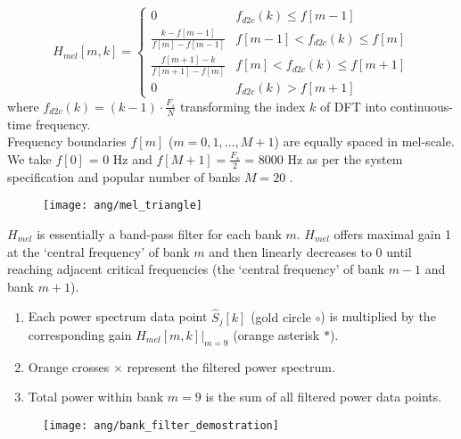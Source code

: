 
\begin{frame}
\begin{equation}
H_{mel}[m, k] =
\begin{cases}
0 &f_{d2c}(k) \le f[m-1]\\
\displaystyle\frac{k - f[m-1]}{f[m] - f[m-1]} &f[m-1] < f_{d2c}(k) \le f[m]\\
\displaystyle\frac{f[m+1] - k}{f[m+1] - f[m]} &f[m] < f_{d2c}(k) \le f[m+1]\\
0 &f_{d2c}(k) > f[m+1]
\end{cases}
\end{equation}
where $f_{d2c}(k) = (k-1) \cdot \frac{F_s}{N}$ transforming the index $k$ of DFT into continuous-time frequency.\\
\vspace{10pt}
Frequency boundaries $f[m]$ ($m = 0, 1, \dots, M+1$) are equally spaced in mel-scale. We take $f[0]$ = 0 Hz and $f[M+1] = \frac{F_s}{2}$ = 8000 Hz as per the system specification and popular number of banks $M = 20$ \cite{davis1980comparison}.
\end{frame}


\begin{frame}
\begin{figure}[H]
\centering
\texttt{[image: ang/mel\_triangle]}
\end{figure}

$H_{mel}$ is essentially a band-pass filter for each bank $m$. $H_{mel}$ offers maximal gain 1 at the `central frequency' of bank $m$ and then linearly decreases to 0 until reaching adjacent critical frequencies (the `central frequency' of bank $m-1$ and bank $m+1$).
\end{frame}


\begin{frame}
\begin{enumerate}
\item Each power spectrum data point $\hat{S}_j[k]$ (\textcolor{gold_matlab}{gold circle $\circ$}) is multiplied by the corresponding gain $H_{mel}[m, k]|_{m=9}$ (\textcolor{orange_matlab}{orange asterisk $*$}).
\item \textcolor{orange_matlab}{Orange crosses $\times$} represent the filtered power spectrum.
\item Total power within bank $m=9$ is the sum of all filtered power data points.
\end{enumerate}

\begin{figure}[H]
\centering
\texttt{[image: ang/bank\_filter\_demostration]}
\end{figure}
\end{frame}

